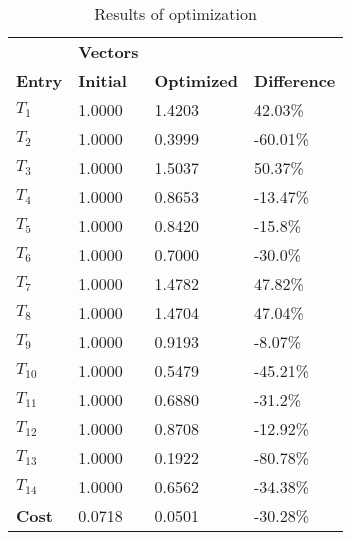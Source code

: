 \begin{table}[H]
\centering
\begin{tabular}{llll}
\textbf{}      & \cellcolor[HTML]{EFEFEF}\textbf{Vectors} & \textbf{} & \textbf{}         \\
\rowcolor[HTML]{EFEFEF} 
\textbf{Entry} & \textbf{Initial} & \textbf{Optimized} & \textbf{Difference} \\
$T_1$ & 1.0000 & 1.4203 & 42.03\% \\ 
$T_2$ & 1.0000 & 0.3999 & -60.01\% \\ 
$T_3$ & 1.0000 & 1.5037 & 50.37\% \\ 
$T_4$ & 1.0000 & 0.8653 & -13.47\% \\ 
$T_5$ & 1.0000 & 0.8420 & -15.8\% \\ 
$T_6$ & 1.0000 & 0.7000 & -30.0\% \\ 
$T_7$ & 1.0000 & 1.4782 & 47.82\% \\ 
$T_8$ & 1.0000 & 1.4704 & 47.04\% \\ 
$T_9$ & 1.0000 & 0.9193 & -8.07\% \\ 
$T_10$ & 1.0000 & 0.5479 & -45.21\% \\ 
$T_11$ & 1.0000 & 0.6880 & -31.2\% \\ 
$T_12$ & 1.0000 & 0.8708 & -12.92\% \\ 
$T_13$ & 1.0000 & 0.1922 & -80.78\% \\ 
$T_14$ & 1.0000 & 0.6562 & -34.38\% \\ 
\rowcolor[HTML]{EFEFEF} 
\textbf{Cost}  & 0.0718 & 0.0501 & -30.28\% \\ 
\end{tabular}
\caption{Results of optimization}
\label{tab:OptimizationAnalysis}
\end{table}